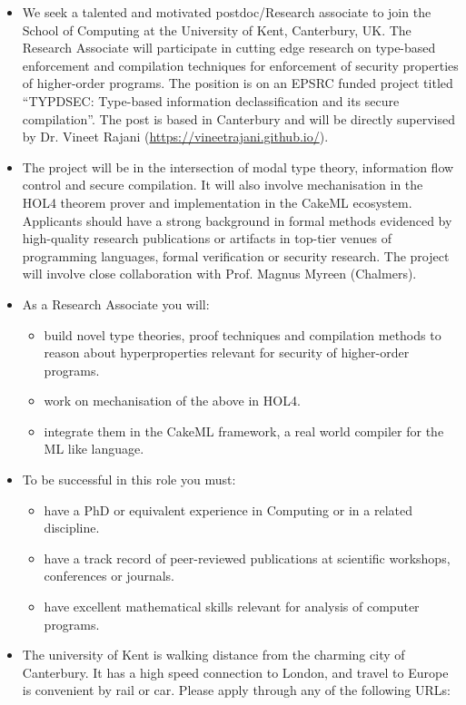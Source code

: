 \documentclass[prodmode,acmtecs]{acmsmall} %
\begin{document}
\begin{itemize}\item  We seek a talented and motivated postdoc/Research associate to join the School of Computing at the University of Kent, Canterbury, UK. The Research Associate will participate in cutting edge research on type-based enforcement and compilation techniques for enforcement of security properties of higher-order programs. The position is on an EPSRC funded project titled ``TYPDSEC: Type-based information declassification and its secure compilation''. The post is based in Canterbury and will be directly supervised by Dr. Vineet Rajani (\href{https://vineetrajani.github.io/}{https://vineetrajani.github.io/}). 
 
\item  The project will be in the intersection of modal type theory, information flow control and secure compilation. It will also involve mechanisation in the HOL4 theorem prover and implementation in the CakeML ecosystem. Applicants should have a strong background in formal methods evidenced by high-quality research publications or artifacts in top-tier venues of programming languages, formal verification or security research. The project will involve close collaboration with Prof. Magnus Myreen (Chalmers). 
 
\item  As a Research Associate you will: 
 
\begin{itemize}\item  build novel type theories, proof techniques and compilation methods to reason about hyperproperties relevant for security of higher-order programs.
\item  work on mechanisation of the above in HOL4.
\item  integrate them in the CakeML framework, a real world compiler for the ML like language.
\end{itemize} 
\item To be successful in this role you must: 
 
\begin{itemize}\item  have a PhD or equivalent experience in Computing or in a related discipline.
\item  have a track record of peer-reviewed publications at scientific workshops, conferences or journals.
\item  have excellent mathematical skills relevant for analysis of computer programs.
\end{itemize} 
\item  The university of Kent is walking distance from the charming city of Canterbury. It has a high speed connection to London, and travel to Europe is convenient by rail or car. Please apply through any of the following URLs: 
 

\end{itemize}
\end{document}

